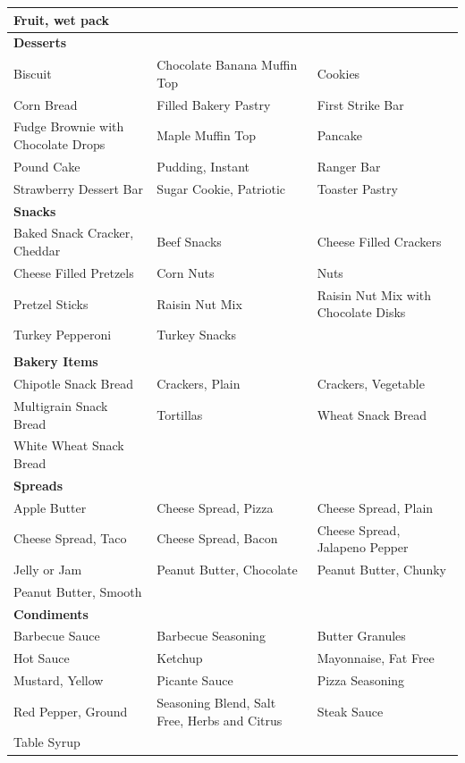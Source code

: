 \begin{landscape}
\begin{longtable}{p{7cm}p{7cm}p{7cm}}
Fruit, wet pack & &  \\
\midrule
\multicolumn{3}{l}{\bf Desserts} \\
\cmidrule(l){1-1}
Biscuit & Chocolate Banana Muffin Top & Cookies\\
Corn Bread & Filled Bakery Pastry & First Strike Bar\\
Fudge Brownie with Chocolate Drops & Maple Muffin Top & Pancake\\
Pound Cake & Pudding, Instant & Ranger Bar\\
Strawberry Dessert Bar & Sugar Cookie, Patriotic & Toaster Pastry\\
\midrule
\multicolumn{3}{l}{\bf Snacks} \\
\cmidrule(l){1-1}
Baked Snack Cracker, Cheddar & Beef Snacks & Cheese Filled Crackers\\
Cheese Filled Pretzels & Corn Nuts & Nuts\\
Pretzel Sticks & Raisin Nut Mix & Raisin Nut Mix with Chocolate Disks\\
Turkey Pepperoni & Turkey Snacks &\\
\\
\multicolumn{3}{l}{\bf Bakery Items} \\
\cmidrule(l){1-1}
Chipotle Snack Bread & Crackers, Plain & Crackers, Vegetable\\
Multigrain Snack Bread & Tortillas & Wheat Snack Bread\\
White Wheat Snack Bread & & \\
\midrule
\multicolumn{3}{l}{\bf Spreads} \\
\cmidrule(l){1-1}
Apple Butter & Cheese Spread, Pizza & Cheese Spread, Plain\\
Cheese Spread, Taco & Cheese Spread, Bacon & Cheese Spread, Jalapeno Pepper\\
Jelly or Jam & Peanut Butter, Chocolate & Peanut Butter, Chunky\\
Peanut Butter, Smooth & & \\
\midrule
\multicolumn{3}{l}{\bf Condiments} \\
\cmidrule(l){1-1}
Barbecue Sauce & Barbecue Seasoning & Butter Granules\\
Hot Sauce & Ketchup & Mayonnaise, Fat Free\\
Mustard, Yellow & Picante Sauce & Pizza Seasoning\\
Red Pepper, Ground & Seasoning Blend, Salt Free, Herbs and Citrus & Steak Sauce\\
Table Syrup & & \\

\end{longtable}
\end{landscape}
